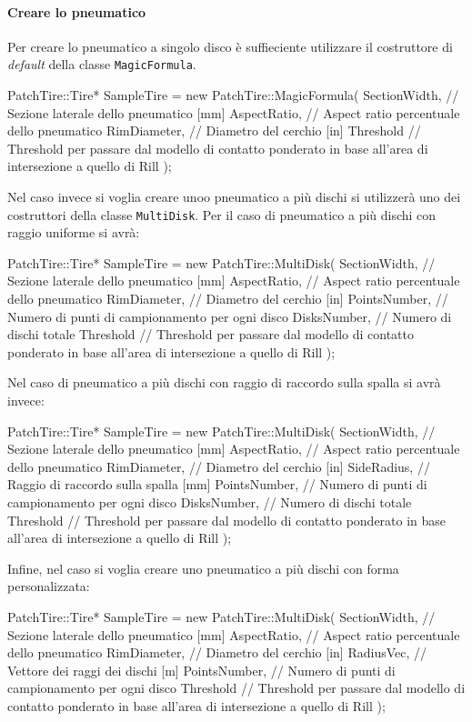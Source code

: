 \paragraph{Creare lo pneumatico}
Per creare lo pneumatico a singolo disco è suffieciente utilizzare il costruttore di \textit{default} della classe \texttt{MagicFormula}.
\begin{pseudoc}
	PatchTire::Tire* SampleTire = new PatchTire::MagicFormula(
		SectionWidth, // Sezione laterale dello pneumatico [mm]
		AspectRatio,  // Aspect ratio percentuale dello pneumatico
		RimDiameter,  // Diametro del cerchio [in]
		Threshold     // Threshold per passare dal modello di contatto ponderato in base all'area di intersezione a quello di Rill 
		);
\end{pseudoc}
Nel caso invece si voglia creare unoo pneumatico a più dischi si utilizzerà uno dei costruttori della classe \texttt{MultiDisk}. Per il caso di pneumatico a più dischi con raggio uniforme si avrà:
\begin{pseudoc}
	PatchTire::Tire* SampleTire = new PatchTire::MultiDisk(
		SectionWidth, // Sezione laterale dello pneumatico [mm]
		AspectRatio,  // Aspect ratio percentuale dello pneumatico
		RimDiameter,  // Diametro del cerchio [in]
		PointsNumber, // Numero di punti di campionamento per ogni disco
		DisksNumber,  // Numero di dischi totale
		Threshold     // Threshold per passare dal modello di contatto ponderato in base all'area di intersezione a quello di Rill 
		);
\end{pseudoc}
Nel caso di pneumatico a più dischi con raggio di raccordo sulla spalla si avrà invece:
\begin{pseudoc}
	PatchTire::Tire* SampleTire = new PatchTire::MultiDisk(
		SectionWidth, // Sezione laterale dello pneumatico [mm]
		AspectRatio,  // Aspect ratio percentuale dello pneumatico
		RimDiameter,  // Diametro del cerchio [in]
		SideRadius,   // Raggio di raccordo sulla spalla [mm]
		PointsNumber, // Numero di punti di campionamento per ogni disco
		DisksNumber,  // Numero di dischi totale
		Threshold     // Threshold per passare dal modello di contatto ponderato in base all'area di intersezione a quello di Rill 
		);
\end{pseudoc}
Infine, nel caso si voglia creare uno pneumatico a più dischi con forma personalizzata:
\begin{pseudoc}
	PatchTire::Tire* SampleTire = new PatchTire::MultiDisk(
		SectionWidth, // Sezione laterale dello pneumatico [mm]
		AspectRatio,  // Aspect ratio percentuale dello pneumatico
		RimDiameter,  // Diametro del cerchio [in]
		RadiusVec,    // Vettore dei raggi dei dischi [m]
		PointsNumber, // Numero di punti di campionamento per ogni disco
		Threshold     // Threshold per passare dal modello di contatto ponderato in base all'area di intersezione a quello di Rill 
		);
\end{pseudoc}
%
